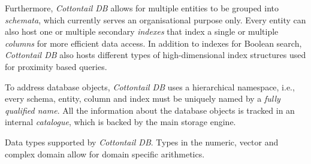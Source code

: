 Furthermore, \emph{Cottontail DB} allows for multiple entities to be grouped into \emph{schemata}, which currently serves an organisational purpose only. Every entity can also host one or multiple secondary \emph{indexes} that index a single or multiple \emph{columns} for more efficient data access. In addition to indexes for Boolean search, \emph{Cottontail DB} also hosts different types of high-dimensional index structures used for proximity based queries.

To address database objects, \emph{Cottontail DB} uses a hierarchical namespace, i.e., every schema, entity, column and index must be uniquely named by a \emph{fully qualified name}. All the information about the database objects is tracked in an internal \emph{catalogue}, which is backed by the main storage engine.

\begin{table}

    \caption{Data types supported by \emph{Cottontail DB}. Types in the numeric, vector and complex domain allow for domain specific arithmetics.}
    \label{table:cottontail_types}


\end{table}
